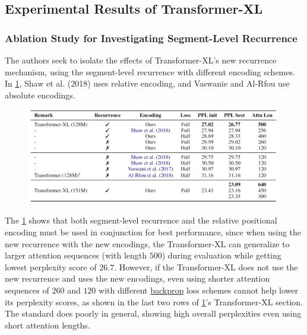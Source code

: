 \subsection{Experimental Results of Transformer-XL} \label{sec:ExpResultsTransXL}

\subsubsection{Ablation Study for Investigating Segment-Level Recurrence}

The authors seek to isolate the effects of Transformer-XL's new recurrence mechanism, using the segment-level recurrence with different encoding schemes. In \cref{tbl:transXL_ablationRECURR}, Shaw et al. (2018) uses relative encoding, and Vaswanie and Al-Rfou use absolute encodings. 






\begin{figure}[h]
\vspace{-5pt}
\centering
\includegraphics[width=0.99\textwidth]{imgs/table_transXL_ablationREC.png}
\vspace{-5pt}
\vspace{-5pt}
\label{tbl:transXL_ablationRECURR}
\end{figure}


The \cref{tbl:transXL_ablationRECURR} shows that both segment-level recurrence and the relative positional encoding must be used in conjunction for best performance, since when using the new recurrence with the new encodings, the Transformer-XL can generalize to larger attention sequences (with length $500$) during evaluation while getting lowest perplexity score of $26.7$. However, if the Transformer-XL does not use the new recurrence and uses the new encodings, even using shorter attention sequences of $260$ and $120$ with different \hyperref[sec:BackwardProp]{backprop} loss schemes cannot help lower its perplexity scores, as shown in the last two rows of \cref{tbl:transXL_ablationRECURR}'s Transformer-XL section. The standard  does poorly in general, showing high overall perplexities even using short attention lengths. 
